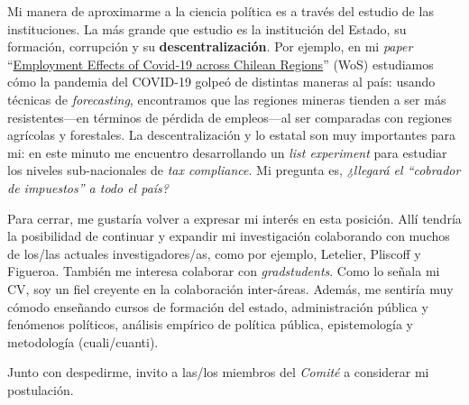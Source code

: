 \documentclass[12pt,stdletter,dateno,sigleft]{newlfm} %
\begin{document}
\begin{newlfm}
Mi manera de aproximarme a la ciencia pol\'itica es a trav\'es del estudio de las instituciones. La m\'as grande que estudio es la instituci\'on del Estado, su formaci\'on, corrupci\'on y su {\bf descentralizaci\'on}. Por ejemplo, en mi \emph{paper} ``\href{https://doi.org/10.1111/rsp3.12337}{Employment Effects of Covid‐19 across Chilean Regions}'' (WoS) estudiamos c\'omo la pandemia del COVID-19 golpe\'o de distintas maneras al pa\'is: usando t\'ecnicas de \emph{forecasting}, encontramos que las regiones mineras tienden a ser m\'as resistentes---en t\'erminos de p\'erdida de empleos---al ser comparadas con regiones agr\'icolas y forestales. La descentralizaci\'on y lo estatal son muy importantes para mi: en este minuto me encuentro desarrollando un \emph{list experiment} para estudiar los niveles sub-nacionales de \emph{tax compliance}. Mi pregunta es, \emph{¿llegar\'a el ``cobrador de impuestos'' a todo el pa\'is?}


Para cerrar, me gustar\'ia volver a expresar mi inter\'es en esta posici\'on. All\'i tendr\'ia la posibilidad de continuar y expandir mi investigaci\'on colaborando con muchos de los/las actuales investigadores/as, como por ejemplo, Letelier, Pliscoff y Figueroa. Tambi\'en me interesa colaborar con \emph{gradstudents}. Como lo se\~nala mi CV, soy un fiel creyente en la colaboraci\'on inter-\'areas. Adem\'as, me sentir\'ia muy c\'omodo ense\~nando cursos de formaci\'on del estado, administraci\'on p\'ublica y fen\'omenos pol\'iticos, an\'alisis emp\'irico de pol\'itica p\'ublica, epistemolog\'ia y metodolog\'ia (cuali/cuanti). 

Junto con despedirme, invito a las/los miembros del \emph{Comit\'e} a considerar mi postulaci\'on.\unskip




\end{newlfm}
\end{document}
